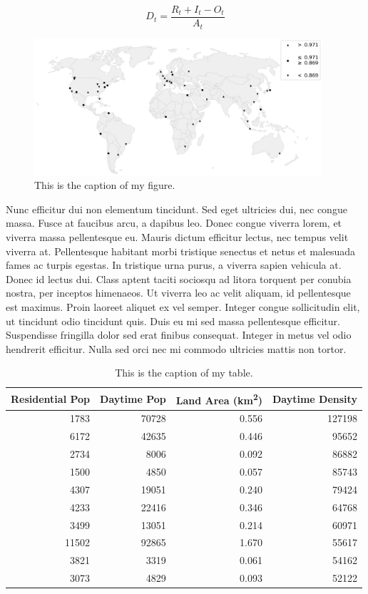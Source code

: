 \documentclass[11pt]{article}           %
\begin{document}
\begin{multicols}{2}
\begin{equation}
	\label{eq:my_equation}
	D_t = \frac{R_t + I_t - O_t}{A_t}
\end{equation}

\begin{figure}[htbp]
	\centering
	\includegraphics[width=0.95\textwidth]{example.png}
	\caption{This is the caption of my figure.}
	\label{fig:my_figure}
\end{figure}

Nunc efficitur dui non elementum tincidunt. Sed eget ultricies dui, nec congue massa. Fusce at faucibus arcu, a dapibus leo. Donec congue viverra lorem, et viverra massa pellentesque eu. Mauris dictum efficitur lectus, nec tempus velit viverra at. Pellentesque habitant morbi tristique senectus et netus et malesuada fames ac turpis egestas. In tristique urna purus, a viverra sapien vehicula at. Donec id lectus dui. Class aptent taciti sociosqu ad litora torquent per conubia nostra, per inceptos himenaeos. Ut viverra leo ac velit aliquam, id pellentesque est maximus. Proin laoreet aliquet ex vel semper. Integer congue sollicitudin elit, ut tincidunt odio tincidunt quis. Duis eu mi sed massa pellentesque efficitur. Suspendisse fringilla dolor sed erat finibus consequat. Integer in metus vel odio hendrerit efficitur. Nulla sed orci nec mi commodo ultricies mattis non tortor.

\begin{table}[tbp]
	\centering
	\caption{This is the caption of my table.}
	\label{tab:my_table}
	\begin{tabular}{rrrr}
		\toprule
		Residential Pop &  Daytime Pop &  Land Area (km\textsuperscript{2}) &  Daytime Density \\
		\midrule
		1783  & 70728 & 0.556 & 127198 \\
		6172  & 42635 & 0.446 &  95652 \\
		2734  &  8006 & 0.092 &  86882 \\
		1500  &  4850 & 0.057 &  85743 \\
		4307  & 19051 & 0.240 &  79424 \\
		4233  & 22416 & 0.346 &  64768 \\
		3499  & 13051 & 0.214 &  60971 \\
		11502 & 92865 & 1.670 &  55617 \\
		3821  &  3319 & 0.061 &  54162 \\
		3073  &  4829 & 0.093 &  52122 \\
		\bottomrule
	\end{tabular}
\end{table}


\end{multicols}
\end{document}
